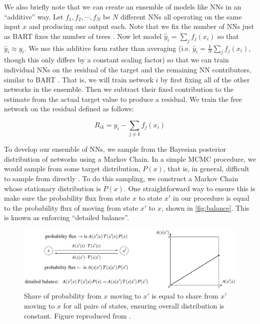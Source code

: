 \documentclass[12pt]{article}
\begin{document}
We also briefly note that we can create an ensemble of models like NNs in an ``additive'' way.  Let $f_1, f_2, \cdots, f_N$ be $N$ different NNs all operating on the same input $x$ and producing one output each.  Note that we fix the number of NNs just as BART fixes the number of trees \cite{chipman2010bart}.  Now let model $\hat{y}_i = \sum_j f_j(x_i)$ so that $\hat{y}_i \approx y_i$.  We use this additive form rather than averaging (i.e. $\hat{y}_i = \frac{1}{N} \sum_j f_j(x_i)$, though this only differs by a constant scaling factor) so that we can train individual NNs on the residual of the target and the remaining NN contributors, similar to BART \cite{chipman2010bart}.  That is, we will train network $i$ by first fixing all of the other networks in the ensemble.  Then we subtract their fixed contribution to the estimate from the actual target value to produce a residual.  We train the free network on the residual defined as follows:

$$
R_{ik} = y_i - \sum_{j\neq k} f_j(x_i)
$$

To develop our ensemble of NNs, we sample from the Bayesian posterior distribution of networks using a Markov Chain.  In a simple MCMC procedure, we would sample from some target distribution, $P(x)$, that is, in general, difficult to sample from directly \cite{haugh2021tutorial}.  To do this sampling, we construct a Markov Chain whose stationary distribution is $P(x)$.  One straightforward way to ensure this is make sure the probability flux from state $x$ to state $x'$ in our procedure is equal to the probability flux of moving from state $x'$ to $x$, shown in \autoref{fig:balance}.  This is known as enforcing ``detailed balance''.

\begin{figure}[htb]
\centering
    \includegraphics[scale=0.4]{figs/balance.png}
    \caption{Share of probability from $x$ moving to $x'$ is equal to share from $x'$ moving to $x$ for all pairs of states, ensuring overall distribution is constant.  Figure reproduced from \cite{stepanov2021math}.}
    \label{fig:balance}
\end{figure}
\end{document}
